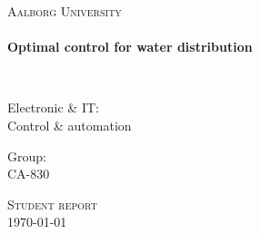 \thispagestyle{empty}

\begin{center}

\vspace*{\fill}

\textsc{\LARGE Aalborg University}\\[1.0cm]

\HRule \\[0.4cm]
{ \HUGE \bfseries  Optimal control for water distribution \\[0.5cm] }

\HRule \\[1.5cm]%

\begin{minipage}{0.4\textwidth}
\begin{flushleft} \large
Electronic \& IT:\\
Control \& automation
\end{flushleft}
\end{minipage}
\begin{minipage}{0.4\textwidth}
\begin{flushright} \large
Group: \\
CA-830
\end{flushright}
\end{minipage}

\vspace*{\fill}

\textsc{\Large Student report}\\[1.0cm]

{\large \today}

\end{center}